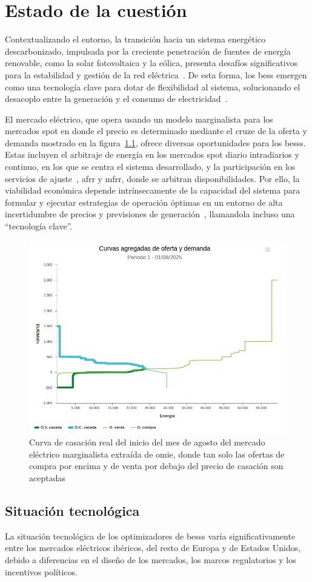 \cleardoublepage

\chapter{Estado de la cuestión}
\label{makereference2}


Contextualizando el entorno, la transición hacia un sistema energético descarbonizado, impulsada por la creciente penetración de fuentes de energía renovable, como la solar fotovoltaica y la eólica, presenta desafíos significativos para la estabilidad y gestión de la red eléctrica~\cite{carrasco2023battery}. De esta forma, los \gls{bess} emergen como una tecnología clave para dotar de flexibilidad al sistema, solucionando el desacoplo entre la generación y el consumo de electricidad~\cite{gissey2018market}.

El mercado eléctrico, que opera usando un modelo marginalista para los mercados spot en donde el precio es determinado mediante el cruze de la oferta y demanda mostrado en la figura~\ref{fig:precio-casacion}, ofrece diversas oportunidades para los \glspl{bess}. Estas incluyen el arbitraje de energía en los mercados spot diario intradiarios y continuo, en los que se centra el sistema desarrollado, y la participación en los servicios de ajuste~\cite{gaspar2021optimisation}, \gls{afrr} y \gls{mfrr}, donde se arbitran disponibilidades. Por ello, la viabilidad económica depende intrínsecamente de la capacidad del sistema para formular y ejecutar estrategias de operación óptimas en un entorno de alta incertidumbre de precios y previsiones de generación~\cite{heredia2015economic}, llamandola incluso una ``tecnología clave''.

\begin{figure}
  \centering
  \includegraphics[width=0.5\linewidth]{figures/precio-casacion.png}
  \caption{Curva de casación real del inicio del mes de agosto del mercado eléctrico marginalista extraída de \gls{omie}, donde tan solo las ofertas de compra por encima y de venta por debajo del precio de casación son aceptadas}
  \label{fig:precio-casacion}
\end{figure}

\section{Situación tecnológica}

La situación tecnológica de los optimizadores de \glspl{bess} varía significativamente entre los mercados eléctricos ibéricos, del resto de Europa y de Estados Unidos, debido a diferencias en el diseño de los mercados, los marcos regulatorios y los incentivos políticos.
